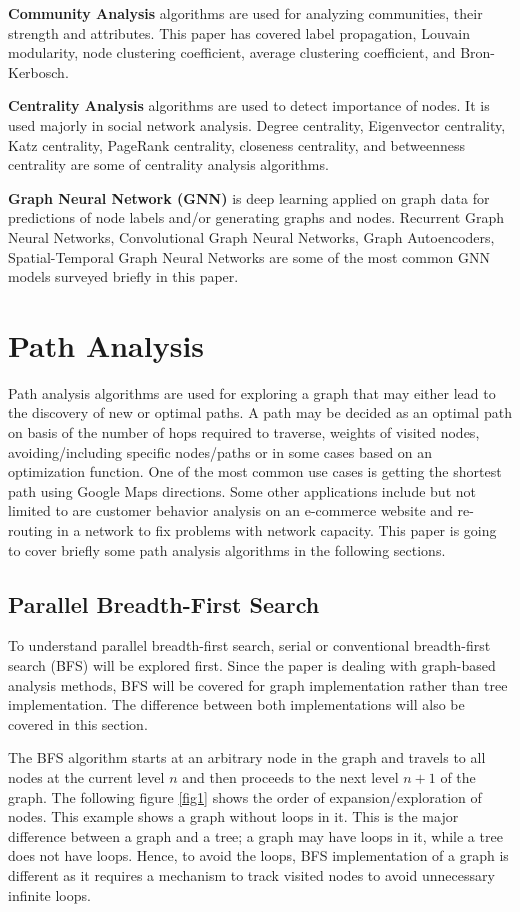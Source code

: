 \documentclass[journal,twoside,web]{ieeecolor}
\begin{document}
\textbf{Community Analysis} algorithms are used for analyzing communities, their strength and attributes. This paper has covered label propagation, Louvain modularity, node clustering coefficient, average clustering coefficient, and Bron-Kerbosch.

\textbf{Centrality Analysis} algorithms are used to detect importance of nodes. It is used majorly in social network analysis. Degree centrality, Eigenvector centrality, Katz centrality, PageRank centrality, closeness centrality, and betweenness centrality are some of centrality analysis algorithms.

\textbf{Graph Neural Network (GNN)} is deep learning applied on graph data for predictions of node labels and/or generating graphs and nodes. Recurrent Graph Neural Networks, Convolutional Graph Neural Networks, Graph Autoencoders, Spatial-Temporal Graph Neural Networks are some of the most common GNN models surveyed briefly in this paper.  

\section{Path Analysis}
\label{sec:path}
Path analysis algorithms are used for exploring a graph that may either lead to the discovery of new or optimal paths. A path may be decided as an optimal path on basis of the number of hops required to traverse, weights of visited nodes, avoiding/including specific nodes/paths or in some cases based on an optimization function. One of the most common use cases is getting the shortest path using Google Maps directions. Some other applications include but not limited to are customer behavior analysis on an e-commerce website and re-routing in a network to fix problems with network capacity. This paper is going to cover briefly some path analysis algorithms in the following sections.

\subsection{Parallel Breadth-First Search}
To understand parallel breadth-first search, serial or conventional breadth-first search (BFS) will be explored first. Since the paper is dealing with graph-based analysis methods, BFS will be covered for graph implementation rather than tree implementation. The difference between both implementations will also be covered in this section.

The BFS algorithm starts at an arbitrary node in the graph and travels to all nodes at the current level $n$ and then proceeds to the next level $n + 1$ of the graph. The following figure \ref{fig1} shows the order of expansion/exploration of nodes. This example shows a graph without loops in it. This is the major difference between a graph and a tree; a graph may have loops in it, while a tree does not have loops. Hence, to avoid the loops, BFS implementation of a graph is different as it requires a mechanism to track visited nodes to avoid unnecessary infinite loops.
\end{document}
